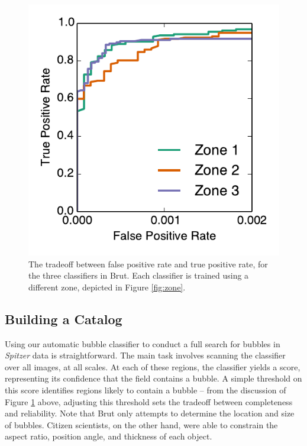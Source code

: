 \begin{figure}[h!]
\includegraphics{roc}
\caption{The tradeoff between false positive rate and true positive rate, for the three classifiers in Brut. Each classifier is trained using a different zone, depicted in Figure \ref{fig:zone}.}
\label{fig:roc}
\end{figure}


\subsection{Building a Catalog}
\label{sec:build}

Using our automatic bubble classifier to conduct a full search for bubbles in \textit{Spitzer} data is straightforward. The main task involves scanning the classifier over all images, at all scales. At each of these regions, the classifier yields a score, representing its confidence that the field contains a bubble. A simple threshold on this score identifies regions likely to contain a bubble -- from the discussion of Figure \ref{fig:roc} above, adjusting this threshold sets the tradeoff between completeness and reliability. Note that Brut only attempts to determine the location and size of bubbles. Citizen scientists, on the other hand, were able to constrain the aspect ratio, position angle, and thickness of each object.

